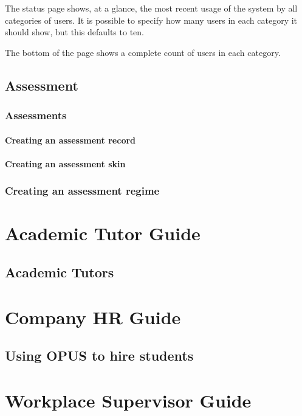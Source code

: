 \documentclass[12 pt]{book}
\begin{document}
The status page shows, at a glance, the most recent usage of the system by all categories of
users. It is possible to specify how many users in each category it should show, but this defaults to ten.

The bottom of the page shows a complete count of users in each category.

%
%
%

\chapter{Assessment}

\section{Assessments}

\subsection{Creating an assessment record}

\subsection{Creating an assessment skin}

\section{Creating an assessment regime}

%
%
%

\part{Academic Tutor Guide}

\chapter{Academic Tutors}

\part{Company HR Guide}

\chapter{Using OPUS to hire students}

\part{Workplace Supervisor Guide}
\end{document}
